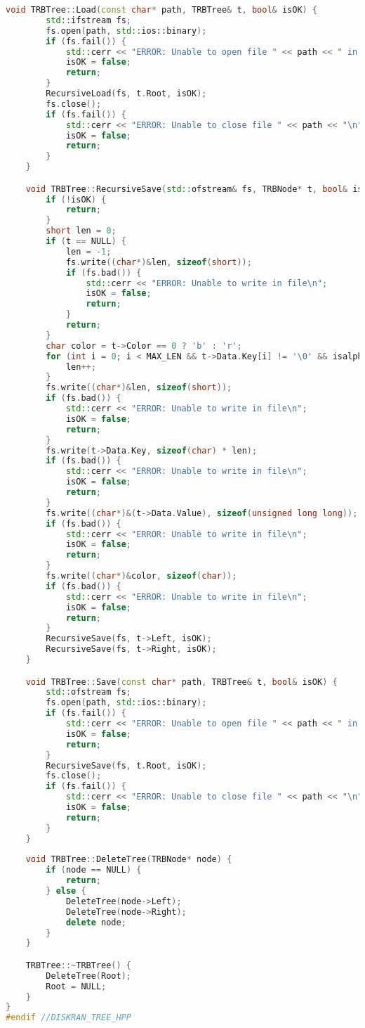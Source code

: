 \begin{lstlisting}[language=C++]
    void TRBTree::Load(const char* path, TRBTree& t, bool& isOK) {
        std::ifstream fs;
        fs.open(path, std::ios::binary);
        if (fs.fail()) {
            std::cerr << "ERROR: Unable to open file " << path << " in read mode\n";
            isOK = false;
            return;
        }
        RecursiveLoad(fs, t.Root, isOK);
        fs.close();
        if (fs.fail()) {
            std::cerr << "ERROR: Unable to close file " << path << "\n";
            isOK = false;
            return;
        }
    }

    void TRBTree::RecursiveSave(std::ofstream& fs, TRBNode* t, bool& isOK) {
        if (!isOK) {
            return;
        }
        short len = 0;
        if (t == NULL) {
            len = -1;
            fs.write((char*)&len, sizeof(short));
            if (fs.bad()) {
                std::cerr << "ERROR: Unable to write in file\n";
                isOK = false;
                return;
            }
            return;
        }
        char color = t->Color == 0 ? 'b' : 'r';
        for (int i = 0; i < MAX_LEN && t->Data.Key[i] != '\0' && isalpha(t->Data.Key[i]) != 0; ++i) {
            len++;
        }
        fs.write((char*)&len, sizeof(short));
        if (fs.bad()) {
            std::cerr << "ERROR: Unable to write in file\n";
            isOK = false;
            return;
        }
        fs.write(t->Data.Key, sizeof(char) * len);
        if (fs.bad()) {
            std::cerr << "ERROR: Unable to write in file\n";
            isOK = false;
            return;
        }
        fs.write((char*)&(t->Data.Value), sizeof(unsigned long long));
        if (fs.bad()) {
            std::cerr << "ERROR: Unable to write in file\n";
            isOK = false;
            return;
        }
        fs.write((char*)&color, sizeof(char));
        if (fs.bad()) {
            std::cerr << "ERROR: Unable to write in file\n";
            isOK = false;
            return;
        }
        RecursiveSave(fs, t->Left, isOK);
        RecursiveSave(fs, t->Right, isOK);
    }

    void TRBTree::Save(const char* path, TRBTree& t, bool& isOK) {
        std::ofstream fs;
        fs.open(path, std::ios::binary);
        if (fs.fail()) {
            std::cerr << "ERROR: Unable to open file " << path << " in write mode\n";
            isOK = false;
            return;
        }
        RecursiveSave(fs, t.Root, isOK);
        fs.close();
        if (fs.fail()) {
            std::cerr << "ERROR: Unable to close file " << path << "\n";
            isOK = false;
            return;
        }
    }
    
    void TRBTree::DeleteTree(TRBNode* node) {
        if (node == NULL) {
            return;
        } else {
            DeleteTree(node->Left);
            DeleteTree(node->Right);
            delete node;
        }
    }

    TRBTree::~TRBTree() {
        DeleteTree(Root);
        Root = NULL;
    }
}
#endif //DISKRAN_TREE_HPP
\end{lstlisting}
\pagebreak

